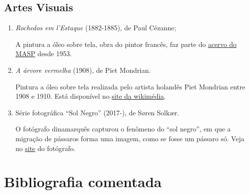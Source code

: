 \documentclass[12pt]{extarticle}
\begin{document}
\subsection{Artes Visuais}

\begin{enumerate}
\item
  \emph{Rochedos em l'Estaque} (1882-1885), de Paul Cézanne;

A pintura a óleo sobre tela, obra do pintor francês, faz parte do \href{https://masp.org.br/acervo/obra/rochedos-em-lestaque}{acervo do MASP} desde 1953.

\item
  \emph{A árvore vermelha} (1908), de Piet Mondrian.

  
Pintura a óleo sobre tela realizada pelo artista holandês Piet Mondrian entre 1908 e 1910. Está disponível no \href{https://commons.wikimedia.org/wiki/File:Piet_Mondrian,_1908-10,_Evening;_Red_Tree_(Avond;_De_rode_boom),_oil_on_canvas,_70_x_99_cm,_Gemeentemuseum_Den_Haag.jpg}{site da wikimédia}.

\item
  Série fotográfica ``Sol Negro'' (2017-), de Søren Solkær.

  O fotógrafo dinamarquês capturou o fenômeno do ``sol negro'', em que a migração de pássaros forma uma imagem, como se fosse um pássaro só. Veja no \href{https://sorensolkaer.com/photographs/blacksun}{site} do fotógrafo.

\end{enumerate}

\section{Bibliografia comentada}
\end{document}
